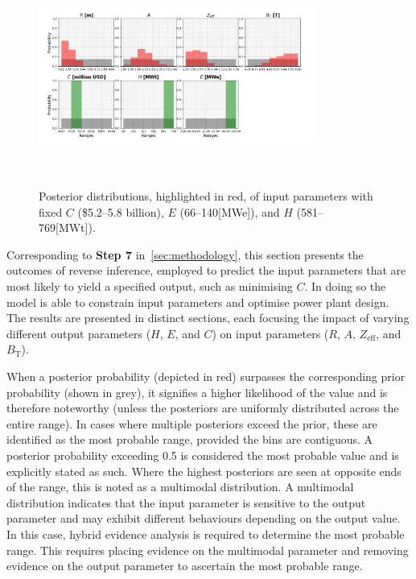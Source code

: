 \documentclass[journal]{IEEEtran}
\begin{document}
\begin{figure}[t]
    \centering
    \includegraphics[width=0.80\textwidth]{figures/TE_results/march_data/config(57)_3outputs_v2_6.png}
    \caption{\small Posterior distributions, highlighted in red, of input parameters with fixed $C$ (\$5.2--5.8 billion), $E$ (66--140[MWe]), and $H$ (581--769[MWt]).}~\label{config(57)_outputs(4)3_eg}
\end{figure}

Corresponding to \textbf{Step 7} in~\ref{sec:methodology}, this section presents the outcomes of reverse inference, employed to predict the input parameters that are most likely to yield a specified output, such as minimising $C$. In doing so the model is able to constrain input parameters and optimise power plant design. The results are presented in distinct sections, each focusing the impact of varying different output parameters ($H$, $E$, and $C$) on input parameters ($R$, $A$, $Z_{\text{eff}}$, and $B_{\text{T}}$).

When a posterior probability (depicted in red) surpasses the corresponding prior probability (shown in grey), it signifies a higher likelihood of the value and is therefore noteworthy (unless the posteriors are uniformly distributed across the entire range). In cases where multiple posteriors exceed the prior, these are identified as the most probable range, provided the bins are contiguous. A posterior probability exceeding 0.5 is considered the most probable value and is explicitly stated as such. Where the highest posteriors are seen at opposite ends of the range, this is noted as a multimodal distribution. A multimodal distribution indicates that the input parameter is sensitive to the output parameter and may exhibit different behaviours depending on the output value. In this case, hybrid evidence analysis is required to determine the most probable range. This requires placing evidence on the multimodal parameter and removing evidence on the output parameter to ascertain the most probable range.   
\end{document}
